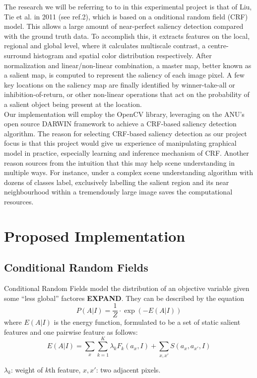 \documentclass[12pt,a4paper]{article}
\newcommand{\BOLDL}[1]{\textbf{\large #1}}
\newcommand{\htab}{\hspace*{0.63cm}}
\begin{document}
\begin{multicols}{2}
The research we will be referring to to in this experimental project is that of Liu, Tie et al. in 2011 (see ref.2), which is based on a onditional random field (CRF) model.  This allows a large amount of near-perfect saliency detection compared with the ground truth data. To accomplish this, it extracts features on the local, regional and global level, where it calculates multiscale contrast, a centre-surround histogram and spatial color distribution respectively. After normalization and linear/non-linear combination, a master map, better known as a salient map, is computed to represent the saliency of each image pixel. A few key locations on the saliency map are finally identified by winner-take-all or inhibition-of-return, or other non-linear operations that act on the probability of a salient object being present at the location.\\
\htab Our implementation will employ the  OpenCV library, leveraging on the ANU's open source DARWIN framework to achieve a CRF-based saliency detection algorithm. The reason for selecting CRF-based saliency detection as our project focus is that this project would give us experience of manipulating graphical model in practice, especially learning and inference mechanism of CRF. Another reason sources from the intuition that this may help scene understanding in multiple ways. For instance, under a complex scene understanding algorithm with dozens of classes label, exclusively labelling the salient region and its near neighbourhood within a tremendously large image saves the computational resources. 
\section{Proposed Implementation}
\subsection{Conditional Random Fields}
Conditional Random Fields model the distribution of an objective variable given some ``less global'' factores \BOLDL{EXPAND}.  They can be described by the equation
    $$ P(A|I) = \frac{1}{Z} \cdot\exp(-E(A|I)) $$
where $E(A|I)$ is the energy function, formulated to be a set of static salient features and one pairwise feature as follows:
    $$ E(A|I) = \sum_{x} \sum_{k=1}^{K} \lambda_{k} F_{k}(a_{x},I)  
        + \sum_{x,x'} S(a_{x},a_{x'},I)  $$ \vspace{-0.4cm}
\begin{center} \footnotesize $\lambda_{k}$: weight of $k$th feature, $x,x'$: two adjacent pixels. \end{center} 


\end{multicols}
\end{document}
